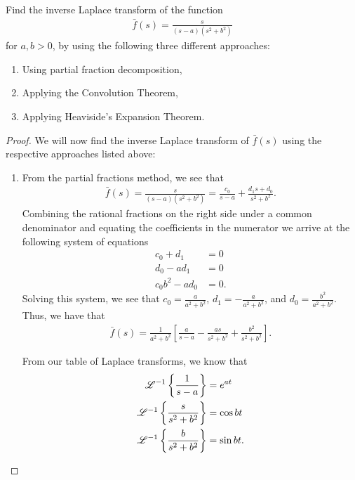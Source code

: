 \begin{problem}{1}
  Find the inverse Laplace transform of the function
  \begin{align*}
    \bar{f}(s) = \frac{s}{(s- a)(s^2 + b^2)}
  \end{align*}
  for $a, b > 0$, by using the following three different approaches:
  \begin{enumerate}
    \item Using partial fraction decomposition,
    \item Applying the Convolution Theorem,
    \item Applying Heaviside's Expansion Theorem.
  \end{enumerate}
\end{problem}

\begin{proof}
  We will now find the inverse Laplace transform of $\bar{f}(s)$ using the respective approaches listed above:
  \begin{enumerate}
    \item
      From the partial fractions method, we see that
      \begin{align*}
        \bar{f}(s) = \frac{s}{(s- a)(s^2 + b^2)} = \frac{c_0}{s- a} + \frac{d_1 s + d_0}{s^2 + b^2}.
      \end{align*}
      Combining the rational fractions on the right side under a common denominator and equating the coefficients
      in the numerator we arrive at the following system of equations
      \begin{align*}
        c_0 + d_1 &= 0 \\
        d_0 - a d_1 &= 0 \\
        c_0 b^2 - a d_0 &= 0.
      \end{align*}
      Solving this system, we see that $\displaystyle c_0 = \frac{a}{a^2+b^2}$,
      $\displaystyle d_1 = -\frac{a}{a^2+b^2}$, and $\displaystyle d_0 = \frac{b^2}{a^2+b^2}$. Thus,
      we have that
      \begin{align*}
        \bar{f}(s) = \frac{1}{a^2+b^2}\left[\frac{a}{s-a} - \frac{as}{s^2+b^2} + \frac{b^2}{s^2+b^2}\right].
      \end{align*}

      From our table of Laplace transforms, we know that
      \begin{align*}
        \mathscr{L}^{-1}\left\{ {\frac{1}{s-a}} \right\} &= e^{at} \\
        \mathscr{L}^{-1}\left\{ {\frac{s}{s^2+b^2}} \right\} &= \cos bt \\
        \mathscr{L}^{-1}\left\{ {\frac{b}{s^2+b^2}} \right\} &= \sin bt.
      \end{align*}


\end{enumerate}
\end{proof}
